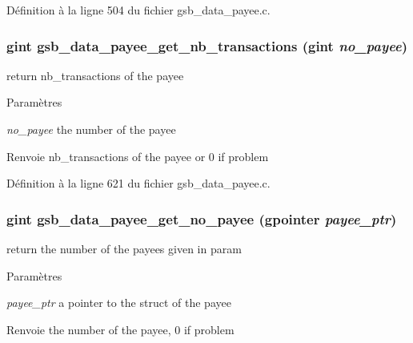 Définition à la ligne 504 du fichier gsb\_\-data\_\-payee.c.

\subsubsection[{gsb\_\-data\_\-payee\_\-get\_\-nb\_\-transactions}]{\setlength{\rightskip}{0pt plus 5cm}gint gsb\_\-data\_\-payee\_\-get\_\-nb\_\-transactions (gint {\em no\_\-payee})}\label{gsb__data__payee_8c_a77b531f63870dea239c1f943329aebb1}
return nb\_\-transactions of the payee


\begin{DoxyParams}{Paramètres}
\item[{\em no\_\-payee}]the number of the payee\end{DoxyParams}
\begin{DoxyReturn}{Renvoie}
nb\_\-transactions of the payee or 0 if problem 
\end{DoxyReturn}


Définition à la ligne 621 du fichier gsb\_\-data\_\-payee.c.

\subsubsection[{gsb\_\-data\_\-payee\_\-get\_\-no\_\-payee}]{\setlength{\rightskip}{0pt plus 5cm}gint gsb\_\-data\_\-payee\_\-get\_\-no\_\-payee (gpointer {\em payee\_\-ptr})}\label{gsb__data__payee_8c_a8fba569c8347fa6e1f98f5f396d6a518}
return the number of the payees given in param


\begin{DoxyParams}{Paramètres}
\item[{\em payee\_\-ptr}]a pointer to the struct of the payee\end{DoxyParams}
\begin{DoxyReturn}{Renvoie}
the number of the payee, 0 if problem 
\end{DoxyReturn}


